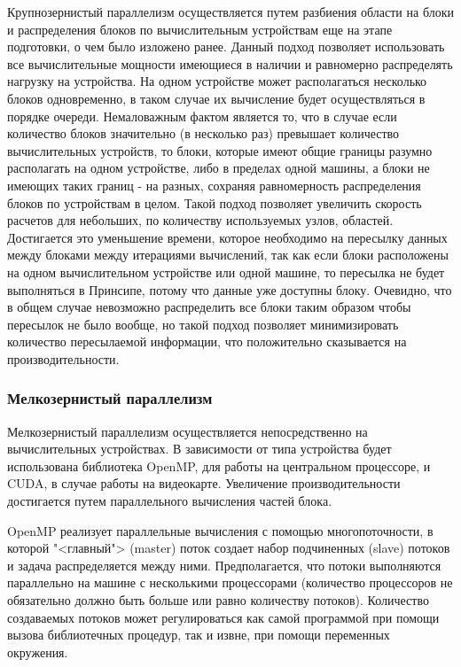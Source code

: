 \documentclass[a4paper, 14pt]{extarticle}
\theoremstyle{definition}
\begin{document}
\par Крупнозернистый параллелизм осуществляется путем разбиения области на блоки и распределения блоков по вычислительным устройствам еще на этапе подготовки, о чем было изложено ранее. Данный подход позволяет использовать все вычислительные мощности имеющиеся в наличии и равномерно распределять нагрузку на устройства. На одном устройстве может располагаться несколько блоков одновременно, в таком случае их вычисление будет осуществляться в порядке очереди. Немаловажным фактом является то, что в случае если количество блоков значительно (в несколько раз) превышает количество вычислительных устройств, то блоки, которые имеют общие границы разумно располагать на одном устройстве, либо в пределах одной машины, а блоки не имеющих таких границ - на разных, сохраняя равномерность распределения блоков по устройствам в целом. Такой подход позволяет увеличить скорость расчетов для небольших, по количеству используемых узлов, областей. Достигается это уменьшение времени, которое необходимо на пересылку данных между блоками между итерациями вычислений, так как если блоки расположены на одном вычислительном устройстве или одной машине, то пересылка не будет выполняться в Принсипе, потому что данные уже доступны блоку. Очевидно, что в общем случае невозможно распределить все блоки таким образом чтобы пересылок не было вообще, но такой подход позволяет минимизировать количество пересылаемой информации, что положительно сказывается на производительности.

\subsubsection{Мелкозернистый параллелизм}

\par Мелкозернистый параллелизм осуществляется непосредственно на вычислительных устройствах. В зависимости от типа устройства будет использована библиотека OpenMP, для работы на центральном процессоре, и CUDA, в случае работы на видеокарте. Увеличение производительности достигается путем параллельного вычисления частей блока.

\par OpenMP реализует параллельные вычисления с помощью многопоточности, в которой "<главный"> (master) поток создает набор подчиненных (slave) потоков и задача распределяется между ними. Предполагается, что потоки выполняются параллельно на машине с несколькими процессорами (количество процессоров не обязательно должно быть больше или равно количеству потоков). Количество создаваемых потоков может регулироваться как самой программой при помощи вызова библиотечных процедур, так и извне, при помощи переменных окружения.
\end{document}
